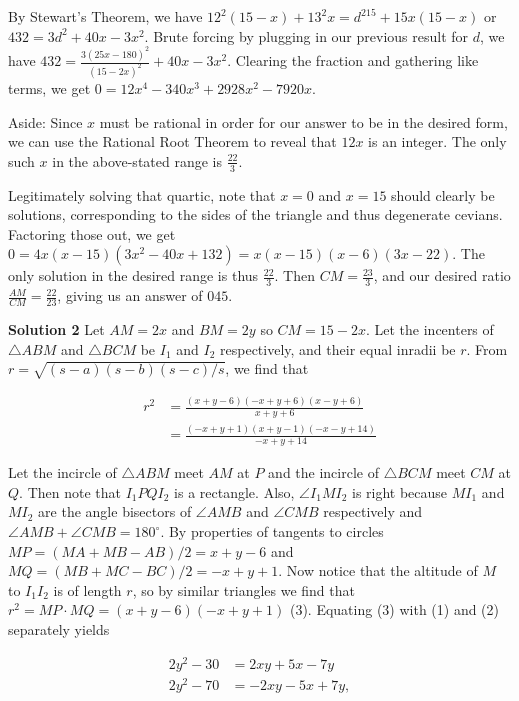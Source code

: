 \documentclass[a4paper,11pt]{article}
\begin{document}
By Stewart's Theorem, we have $12^2(15 - x) + 13^2x = d^215 + 15x(15 - x)$ or $432 = 3d^2 + 40x - 3x^2.$ Brute forcing by plugging in our previous result for $d$, we have $432 = \frac {3(25x - 180)^2}{(15 - 2x)^2} + 40x - 3x^2.$ Clearing the fraction and gathering like terms, we get $0 = 12x^4 - 340x^3 + 2928x^2 - 7920x.$

Aside: Since $x$ must be rational in order for our answer to be in the desired form, we can use the Rational Root Theorem to reveal that $12x$ is an integer. The only such $x$ in the above-stated range is $\frac {22}3$.

Legitimately solving that quartic, note that $x = 0$ and $x = 15$ should clearly be solutions, corresponding to the sides of the triangle and thus degenerate cevians. Factoring those out, we get $0 = 4x(x - 15)(3x^2 - 40x + 132) = x(x - 15)(x - 6)(3x - 22).$ The only solution in the desired range is thus $\frac {22}3$. Then $CM = \frac {23}3$, and our desired ratio $\frac {AM}{CM} = \frac {22}{23}$, giving us an answer of $\boxed{045}$.

\textbf{Solution 2}
Let $AM = 2x$ and $BM = 2y$ so $CM = 15 - 2x$. Let the incenters of $\triangle ABM$ and $\triangle BCM$ be $I_1$ and $I_2$ respectively, and their equal inradii be $r$. From $r = \sqrt {(s - a)(s - b)(s - c)/s}$, we find that

\begin{equation} \label{eq1}
\begin{split}
r^2 & = \frac {(x + y - 6)( - x + y + 6)(x - y + 6)}{x + y + 6} \\ & = \frac {( - x + y + 1)(x + y - 1)( - x - y + 14)}{ - x + y + 14}
\end{split}
\end{equation}


Let the incircle of $\triangle ABM$ meet $AM$ at $P$ and the incircle of $\triangle BCM$ meet $CM$ at $Q$. Then note that $I_1 P Q I_2$ is a rectangle. Also, $\angle I_1 M I_2$ is right because $MI_1$ and $MI_2$ are the angle bisectors of $\angle AMB$ and $\angle CMB$ respectively and $\angle AMB + \angle CMB = 180^\circ$. By properties of tangents to circles $MP = (MA + MB - AB)/2 = x + y - 6$ and $MQ = (MB + MC - BC)/2 = - x + y + 1$. Now notice that the altitude of $M$ to $I_1 I_2$ is of length $r$, so by similar triangles we find that $r^2 = MP \cdot MQ = (x + y - 6)( - x + y + 1)$ (3). Equating (3) with (1) and (2) separately yields

\begin{equation} \label{eq1}
\begin{split}
2y^2 - 30 &= 2xy + 5x - 7y \\  2y^2 - 70 &= - 2xy - 5x + 7y, 
\end{split}
\end{equation}
\end{document}
